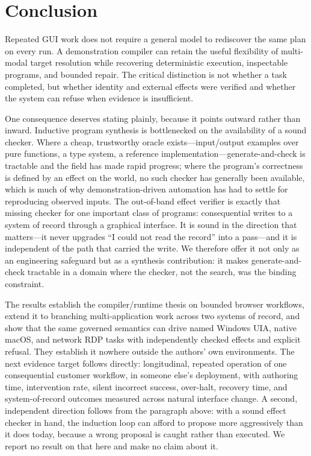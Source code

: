 \section{Conclusion}

Repeated GUI work does not require a general model to rediscover the same plan
on every run. A demonstration compiler can retain the useful flexibility of
multi-modal target resolution while recovering deterministic execution,
inspectable programs, and bounded repair. The critical distinction is not
whether a task completed, but whether identity and external effects were
verified and whether the system can refuse when evidence is insufficient.

One consequence deserves stating plainly, because it points outward rather than
inward. Inductive program synthesis is bottlenecked on the availability of a
sound checker. Where a cheap, trustworthy oracle exists---input/output examples
over pure functions, a type system, a reference implementation---generate-and-check
is tractable and the field has made rapid progress; where the program's
correctness is defined by an effect on the world, no such checker has generally
been available, which is much of why demonstration-driven automation has had to
settle for reproducing observed inputs. The out-of-band effect verifier is
exactly that missing checker for one important class of programs: consequential
writes to a system of record through a graphical interface. It is sound in the
direction that matters---it never upgrades ``I could not read the record'' into
a pass---and it is independent of the path that carried the write. We therefore
offer it not only as an engineering safeguard but as a synthesis contribution:
it makes generate-and-check tractable in a domain where the checker, not the
search, was the binding constraint.

The results establish the compiler/runtime thesis on bounded browser workflows,
extend it to branching multi-application work across two systems of record, and
show that the same governed semantics can drive named Windows UIA, native
macOS, and network RDP tasks with independently checked effects and explicit
refusal. They establish it nowhere outside the authors' own environments. The
next evidence target follows directly: longitudinal, repeated operation of one
consequential customer workflow, in someone else's deployment, with authoring
time, intervention rate, silent
incorrect success, over-halt, recovery time, and system-of-record outcomes
measured across natural interface change. A second, independent direction
follows from the paragraph above: with a sound effect checker in hand, the
induction loop can afford to propose more aggressively than it does today,
because a wrong proposal is caught rather than executed. We report no result on
that here and make no claim about it.
